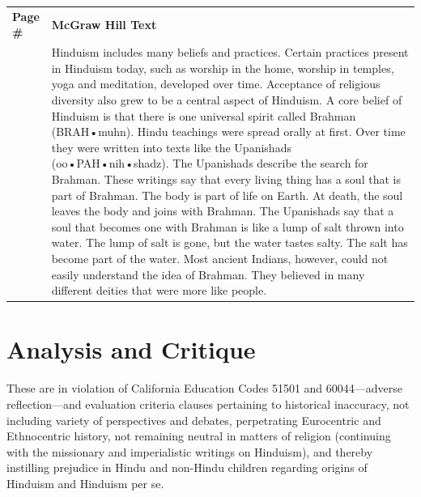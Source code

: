 \begin{longtable}{|>{\raggedleft}p{1.5cm}|p{8.5cm}|}
\multicolumn{2}{c}{\textbf{Table: 2}}\\ 
\hline
\textbf{Page \#} & \textbf{McGraw Hill Text} \tabularnewline
\hline
261 & Hinduism includes many beliefs and practices. Certain practices present in Hinduism today, such as worship in the home, worship in temples, yoga and meditation, developed over time. Acceptance of religious diversity also grew to be a central aspect of Hinduism. A core belief of Hinduism is that there is one universal spirit called Brahman (BRAH•muhn). Hindu teachings were spread orally at first. Over time they were written into texts like the Upanishads (oo•PAH•nih•shadz). The Upanishads describe the search for Brahman. These writings say that every living thing has a soul that is part of Brahman. The body is part of life on Earth. At death, the soul leaves the body and joins with Brahman. The Upanishads say that a soul that becomes one with Brahman is like a lump of salt thrown into water. The lump of salt is gone, but the water tastes salty. The salt has become part of the water. Most ancient Indians, however, could not easily understand the idea of Brahman. They believed in many different deities that were more like people. \tabularnewline
\hline
\end{longtable}

\section*{Analysis and Critique} 

These are in violation of California Education Codes 51501 and 60044—adverse reflection—and evaluation criteria clauses pertaining to historical inaccuracy, not including variety of perspectives and debates, perpetrating Eurocentric and Ethnocentric history, not remaining neutral in matters of religion (continuing with the missionary and imperialistic writings on Hinduism), and thereby instilling prejudice in Hindu and non-Hindu children regarding origins of Hinduism and Hinduism per se.

